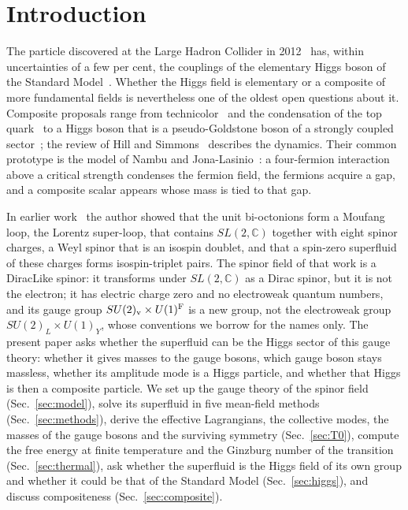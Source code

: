 \documentclass[aps,prd,twocolumn,superscriptaddress,nofootinbib,floatfix,longbibliography]{revtex4-2}
\begin{document}
\maketitle

\section{Introduction}
\label{sec:intro}

The particle discovered at the Large Hadron Collider in 2012~\cite{ATLAS2012,CMS2012} has, within uncertainties of a few
per cent, the couplings of the elementary Higgs boson of the Standard Model~\cite{ATLAS2022,CMS2022,PDG2024}. Whether the
Higgs field is elementary or a composite of more fundamental fields is nevertheless one of the oldest open questions about
it. Composite proposals range from technicolor~\cite{Weinberg1976,Susskind1979} and the condensation of the top
quark~\cite{Miransky1989,BHL1990} to a Higgs boson that is a pseudo-Goldstone boson of a strongly coupled
sector~\cite{KaplanGeorgi1984,Agashe2005}; the review of Hill and Simmons~\cite{HillSimmons2003} describes the dynamics. Their
common prototype is the model of Nambu and Jona-Lasinio~\cite{NJL1961}: a four-fermion interaction above a critical
strength condenses the fermion field, the fermions acquire a gap, and a composite scalar appears whose mass is tied to
that gap.

In earlier work~\cite{Nash2026} the author showed that the unit bi-octonions form a Moufang loop, the Lorentz super-loop,
that contains $SL(2,\mathbb C)$ together with eight spinor charges, a Weyl spinor that is an isospin doublet, and that a
spin-zero superfluid of these charges forms isospin-triplet pairs. The spinor field of that work is a DiracLike spinor: it
transforms under $SL(2,\mathbb C)$ as a Dirac spinor, but it is not the electron; it has electric charge zero and no
electroweak quantum numbers, and its gauge group $SU(2)_{\rm v}\times U(1)^{\rm F}$ is a new group, not the electroweak group
$SU(2)_L\times U(1)_Y$, whose conventions we borrow for the names only. The present paper asks whether the superfluid can
be the Higgs sector of this gauge theory: whether it gives masses to the gauge bosons, which gauge boson stays massless,
whether its amplitude mode is a Higgs particle, and whether that Higgs is then a composite particle. We set up the gauge
theory of the spinor field (Sec.~\ref{sec:model}), solve its superfluid in five mean-field methods
(Sec.~\ref{sec:methods}), derive the effective Lagrangians, the collective modes, the masses of the gauge bosons and the
surviving symmetry (Sec.~\ref{sec:T0}), compute the free energy at finite temperature and the Ginzburg number of the
transition (Sec.~\ref{sec:thermal}), ask whether the superfluid is the Higgs field of its own group and whether it could be
that of the Standard Model (Sec.~\ref{sec:higgs}), and discuss compositeness (Sec.~\ref{sec:composite}).
\end{document}

